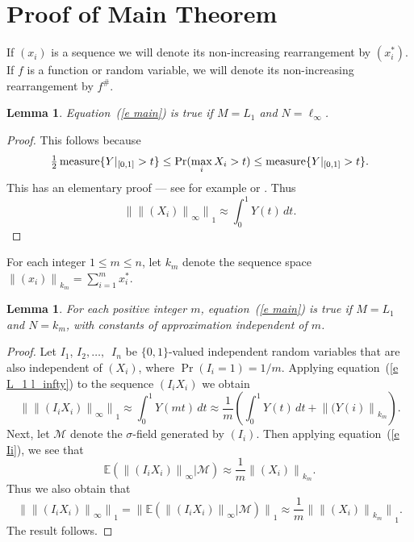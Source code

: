 \documentclass[12pt]{amsart}
\newtheorem{lemma}[thm]{Lemma}
\newcommand{\E}{{\mathbb E}}
\newcommand{\snormo}[1]{{\mathopen\|#1\mathclose\|}}
\newcommand{\measure}{\text{\rm measure}}
\begin{document}
\section{Proof of Main Theorem}

If $(x_i)$ is a sequence we will denote its non-increasing rearrangement
by $(x^*_i)$.  If $f$ is a function or random variable, we will denote
its non-increasing rearrangement by $f^\#$.

\begin{lemma}
\label{l L_1 l_infty}
Equation~(\ref{e main}) is true if $M = L_1$ and $N = \ell_\infty$.
\end{lemma}

\begin{proof}
This follows because 
\begin{equation}
\label{e max in Pr}
    {\textstyle\frac12}\,\measure\{ Y|_{[0,1]} > t\}
    \le
    \Pr(\max_i X_i > t)
    \le
    \measure\{ Y|_{[0,1]} > t\} .
\end{equation}
This has an elementary proof --- 
see for example \cite[Proposition 2.1]{hitczenko-montgomery-smith} or
\cite{gine-zinn}.  Thus
\begin{equation}
\label{e L_1 l_infty}
   \snormo{\snormo{(X_i)}_\infty}_1 \approx \int_0^1 Y(t) \, dt .
\end{equation}
\end{proof}

For each integer $1\le m\le n$, let $k_m$ denote the sequence space
$\snormo{(x_i)}_{k_m} = \sum_{i=1}^m x^*_i$.

\begin{lemma}
\label{l L_1 k_m}
For each positive integer $m$, 
equation~(\ref{e main}) is true if $M = L_1$ and $N = k_m$, with
constants of approximation independent of $m$.
\end{lemma}

\begin{proof}
Let $I_1$, $I_2,\dots,$\ $I_n$ be $\{0,1\}$-valued
independent random variables that
are also independent of $(X_i)$, where $\Pr(I_i = 1) = 1/m$.  
Applying equation~(\ref{e L_1 l_infty})
to the sequence $(I_i X_i)$ we obtain
\begin{equation}
\label{e Ii}
   \snormo{\snormo{(I_i X_i)}_\infty}_1 
   \approx \int_0^1 Y(mt) \, dt
   \approx \frac1m \left( \int_0^1 Y(t) \, dt + 
   \snormo{(Y(i)}_{k_m} \right).
\end{equation}
Next, let $\mathcal M$ denote the $\sigma$-field generated by $(I_i)$.
Then applying equation~(\ref{e Ii}), we see that
\[
   \E(\snormo{(I_i X_i)}_\infty | \mathcal M)
   \approx \frac1m \snormo{(X_i)}_{k_m} . \]
Thus we also obtain that
\[
   \snormo{\snormo{(I_i X_i)}_\infty}_1 
   = \snormo{ \E(\snormo{(I_i X_i)}_\infty | \mathcal M) }_1
   \approx
   \frac1m \snormo{\snormo{(X_i)}_{k_m}}_1 .\]
The result follows.
\end{proof}
\end{document}
